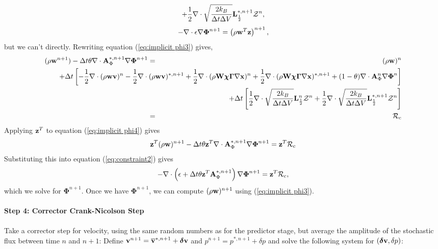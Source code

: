 \documentclass[final]{siamltex}
\def\Ab {{\bf A}}
\def\Lb {{\bf L}}
\def\vb {{\bf v}}
\def\wb {{\bf w}}
\def\Wb {{\bf W}}
\def\xb {{\bf x}}
\def\zb {{\bf z}}
\def\chib   {\boldsymbol{\chi}}
\def\deltab {\boldsymbol{\delta}}
\def\Gammab {\boldsymbol{\Gamma}}
\def\Phib   {\boldsymbol{\Phi}}
\def\half   {\frac{1}{2}}
\begin{document}
{\begin{eqnarray}
+ \half\nabla\cdot\sqrt{\frac{2k_B}{\Delta t\Delta V}}\Lb_\half^{*,n+1}\mathcal{Z}^n,\label{eq:implicit phi3}
\end{eqnarray}
\begin{equation}
-\nabla\cdot\epsilon\nabla\Phib^{n+1} = \left(\rho\wb^T\zb\right)^{n+1},\label{eq:constraint2}
\end{equation}
but we can't directly.  Rewriting equation (\ref{eq:implicit phi3}) gives,
\begin{eqnarray}
(\rho\wb^{n+1}) - \Delta t\theta\nabla\cdot \Ab_\Phi^{*,n+1}\nabla\Phib^{n+1} &=& (\rho\wb)^n\nonumber\\
&&\hspace{-2in} + \Delta t\left[-\half\nabla\cdot(\rho\wb\vb)^n - \half\nabla\cdot(\rho\wb\vb)^{*,n+1} + \half\nabla\cdot(\rho\Wb\chib\Gammab\nabla\xb)^n + \half\nabla\cdot(\rho\Wb\chib\Gammab\nabla\xb)^{*,n+1} + (1-\theta)\nabla\cdot \Ab_\Phi^n\nabla\Phib^n \right]\label{eq:implicit phi4}\nonumber\\
&&\hspace{-2in}+ \Delta t\left[
\half\nabla\cdot\sqrt{\frac{2k_B}{\Delta t\Delta V}}\Lb_\half^n\mathcal{Z}^n
+ \half\nabla\cdot\sqrt{\frac{2k_B}{\Delta t\Delta V}}\Lb_\half^{*,n+1}\mathcal{Z}^n
\right]\nonumber\\
&=& \mathcal{R}_c
\end{eqnarray}
Applying $\zb^T$ to equation (\ref{eq:implicit phi4}) gives
\begin{equation}
\zb^T(\rho\wb)^{n+1} - \Delta t\theta\zb^T\nabla\cdot \Ab_\Phi^{*,n+1}\nabla\Phib^{n+1} = \zb^T\mathcal{R}_c
\end{equation}
Substituting this into equation (\ref{eq:constraint2}) gives
\begin{equation}
-\nabla\cdot\left(\epsilon + \Delta t\theta\zb^T \Ab_\Phi^{*,n+1}\right)\nabla\Phib^{n+1} = \zb^T\mathcal{R}_c,
\end{equation}
which we solve for $\Phib^{n+1}$.  Once we have $\Phib^{n+1}$, we can compute 
$(\rho\wb)^{n+1}$ using (\ref{eq:implicit phi3}).\\ \\
{\bf Step 4: Corrector Crank-Nicolson Step}\\ \\
Take a corrector step for velocity, using the same random numbers as for the predictor
stage, but average the amplitude of the stochastic flux between time $n$ and $n+1$:
Define $\vb^{n+1} = \overline\vb^{*,n+1} + \deltab\vb$ and $p^{n+1} = p^{*,n+1} + \delta p$ and
solve the following system for $(\deltab\vb,\delta p)$:
}
\end{document}
